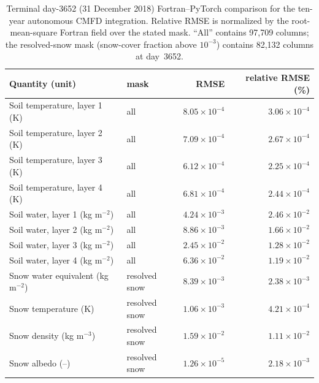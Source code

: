 \begin{table}[H]
\caption{Terminal day-3652 (31 December 2018) Fortran--PyTorch comparison for
the ten-year autonomous CMFD integration. Relative RMSE is normalized
by the root-mean-square Fortran field over the stated mask. ``All'' contains
97,709 columns; the resolved-snow mask (snow-cover fraction above
$10^{-3}$) contains 82,132 columns at day~3652.}
\label{tab:multiyear-autonomous}
\centering
\small
\begin{tabular}{llrr}
\hline
Quantity (unit) & mask & RMSE & relative RMSE (\%) \\
\hline
Soil temperature, layer 1 (K) & all & $8.05\times10^{-4}$ & $3.06\times10^{-4}$ \\
Soil temperature, layer 2 (K) & all & $7.09\times10^{-4}$ & $2.67\times10^{-4}$ \\
Soil temperature, layer 3 (K) & all & $6.12\times10^{-4}$ & $2.25\times10^{-4}$ \\
Soil temperature, layer 4 (K) & all & $6.81\times10^{-4}$ & $2.44\times10^{-4}$ \\
Soil water, layer 1 (kg m$^{-2}$) & all & $4.24\times10^{-3}$ & $2.46\times10^{-2}$ \\
Soil water, layer 2 (kg m$^{-2}$) & all & $8.86\times10^{-3}$ & $1.66\times10^{-2}$ \\
Soil water, layer 3 (kg m$^{-2}$) & all & $2.45\times10^{-2}$ & $1.28\times10^{-2}$ \\
Soil water, layer 4 (kg m$^{-2}$) & all & $6.36\times10^{-2}$ & $1.19\times10^{-2}$ \\
Snow water equivalent (kg m$^{-2}$) & resolved snow & $8.39\times10^{-3}$ & $2.38\times10^{-3}$ \\
Snow temperature (K) & resolved snow & $1.06\times10^{-3}$ & $4.21\times10^{-4}$ \\
Snow density (kg m$^{-3}$) & resolved snow & $1.59\times10^{-2}$ & $1.11\times10^{-2}$ \\
Snow albedo (--) & resolved snow & $1.26\times10^{-5}$ & $2.18\times10^{-3}$ \\
\hline
\end{tabular}
\end{table}


